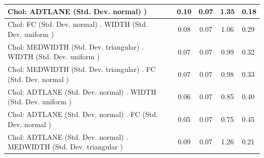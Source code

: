 \begin{table}
\begin{center}
\begin{tabular}{|l|l|c|c|c|l|}
			\hline
			 Chol: ADTLANE (Std. Dev. normal) ) &  & 0.10 & 0.07 & 1.35 & 0.18 \\
			\hline
			 Chol: FC (Std. Dev. normal) . WIDTH (Std. Dev.   uniform ) &  & 0.08 & 0.07 & 1.06 & 0.29 \\
			\hline
			 Chol: MEDWIDTH (Std. Dev. triangular) . WIDTH (Std. Dev.   uniform ) &  & 0.07 & 0.07 & 0.99 & 0.32 \\
			\hline
			 Chol: MEDWIDTH (Std. Dev. triangular) . FC (Std. Dev.   normal ) &  & 0.07 & 0.07 & 0.98 & 0.33 \\
			\hline
			 Chol: ADTLANE (Std. Dev. normal) . WIDTH (Std. Dev.   uniform ) &  & 0.06 & 0.07 & 0.85 & 0.40 \\
			\hline
			 Chol: ADTLANE (Std. Dev. normal) . FC (Std. Dev.   normal ) &  & 0.05 & 0.07 & 0.75 & 0.45 \\
			\hline
			 Chol: ADTLANE (Std. Dev. normal) . MEDWIDTH (Std. Dev.   triangular ) &  & 0.09 & 0.07 & 1.26 & 0.21 \\
			\hline
		\end{tabular}
	\end{center}
\end{table}